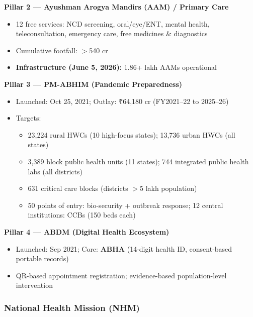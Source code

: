 \textbf{Pillar 2 — Ayushman Arogya Mandirs (AAM) / Primary Care}
\begin{itemize}
  \item 12 free services: NCD screening, oral/eye/ENT, mental health, teleconsultation, emergency care, free medicines \& diagnostics
  \item Cumulative footfall: $>$540 cr
  \item \textbf{Infrastructure (June 5, 2026):} 1.86+ lakh AAMs operational
\end{itemize}

\textbf{Pillar 3 — PM-ABHIM (Pandemic Preparedness)}
\begin{itemize}
  \item Launched: Oct 25, 2021; Outlay: ₹64,180 cr (FY2021--22 to 2025--26)
  \item Targets:
    \begin{itemize}
      \item 23,224 rural HWCs (10 high-focus states); 13,736 urban HWCs (all states)
      \item 3,389 block public health units (11 states); 744 integrated public health labs (all districts)
      \item 631 critical care blocks (districts $>$5 lakh population)
      \item 50 points of entry: bio-security + outbreak response; 12 central institutions: CCBs (150 beds each)
    \end{itemize}
\end{itemize}

\textbf{Pillar 4 — ABDM (Digital Health Ecosystem)}
\begin{itemize}
  \item Launched: Sep 2021; Core: \textbf{ABHA} (14-digit health ID, consent-based portable records)
  \item QR-based appointment registration; evidence-based population-level intervention
\end{itemize}

\subsubsection*{National Health Mission (NHM)}

